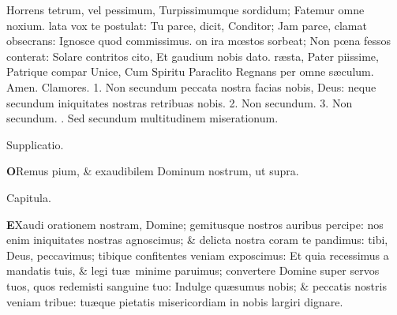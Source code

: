 \documentclass[letter,11pt]{book}
\makeatletter
\DeclareRobustCommand{\Vbar}{\vers@resp{-0.1em}{V}}
\newcommand{\vers@resp@sym}{\raisebox{0.2ex}{\rotatebox[origin=c]{-20}{$\m@th\rceil$}}}
\newcommand{\vers@resp}[2]{%
  {\ooalign{\hidewidth\kern#1\vers@resp@sym\hidewidth\cr#2\cr}}%
}%
\def\V{\color{Red} \Vbar . \color{black}}
\makeatother
\begin{document}
\begin{multicols*}{2}
\newline \indent Horrens tetrum, vel pessimum,
\newline \indent Turpissimumque sordidum;
\newline \indent Fatemur omne noxium.
lata vox te postulat:
\newline \indent Tu parce, dicit, Conditor;
\newline \indent Jam parce, clamat obsecrans:
\newline \indent Ignosce quod commissimus.
on ira m\oe stos sorbeat;
\newline \indent Non p\oe na fessos conterat:
\newline \indent Solare contritos cito,
\newline \indent Et gaudium nobis dato.
r\ae sta, Pater piissime,
\newline \indent Patrique compar Unice,
\newline \indent Cum Spiritu Paraclito
\newline \indent Regnans per omne s\ae culum. Amen.
\newline \color{Red} Clamores. 1. \color{black} Non secundum peccata nostra facias nobis, Deus: neque secundum iniquitates nostras retribuas nobis. \color{Red} 2. \color{black} Non secundum. \color{Red} 3. \color{black} Non secundum. \V Sed secundum multitudinem miserationum.
\vspace{-.5em} \begin{center} \color{Red} Supplicatio. \end{center} \vspace{-.5em}
\lettrine[lines=2]{\bfseries \color{Red} O}{}Remus pium, \& exaudibilem Dominum nostrum, \color{Red} ut supra. \color{black}%
\vspace{-.5em} \begin{center} \color{Red} Capitula. \end{center} \vspace{-.5em}
\lettrine[lines=2]{\bfseries \color{Red} E}{}Xaudi orationem nostram, Domine; gemitusque nostros auribus percipe: nos enim iniquitates nostras agnoscimus; \& delicta nostra coram te pandimus: tibi, Deus, peccavimus; tibique confitentes veniam exposcimus: Et quia recessimus a mandatis tuis, \& legi tu\ae \ minime paruimus; convertere Domine super servos tuos, quos redemisti sanguine tuo: Indulge qu\ae sumus nobis; \& peccatis nostris veniam tribue: tu\ae que pietatis misericordiam in nobis largiri dignare.

\end{multicols*}
\end{document}
